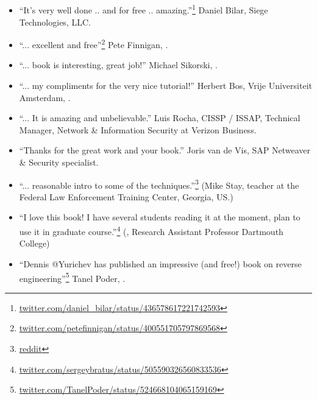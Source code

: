 \subsection*{ \IT{\TITLE}}

\begin{itemize}
\item ``It's very well done .. and for free .. amazing.''\footnote{\href{http://go.yurichev.com/17095}{twitter.com/daniel_bilar/status/436578617221742593}} Daniel Bilar, Siege Technologies, LLC.

\item ``... excellent and free''\footnote{\href{http://go.yurichev.com/17096}{twitter.com/petefinnigan/status/400551705797869568}} Pete Finnigan, \oracle{}.

\item ``... book is interesting, great job!'' Michael Sikorski,  .

\item ``... my compliments for the very nice tutorial!'' Herbert Bos,  Vrije Universiteit Amsterdam,  .

\item ``... It is amazing and unbelievable.'' Luis Rocha, CISSP / ISSAP, Technical Manager, Network \& Information Security at Verizon Business.

\item ``Thanks for the great work and your book.'' Joris van de Vis, SAP Netweaver \& Security specialist.

\item ``... reasonable intro to some of the techniques.''\footnote{\href{http://go.yurichev.com/17099}{reddit}} (Mike Stay, teacher at the Federal Law Enforcement Training Center, Georgia, US.)

\item ``I love this book! I have several students reading it at the moment, plan to use it in graduate course.''\footnote{\href{http://go.yurichev.com/17097}{twitter.com/sergeybratus/status/505590326560833536}} (, Research Assistant Professor   Dartmouth College)

\item ``Dennis @Yurichev has published an impressive (and free!) book on reverse engineering''\footnote{\href{http://go.yurichev.com/17098}{twitter.com/TanelPoder/status/524668104065159169}} Tanel Poder, .

\end{itemize}